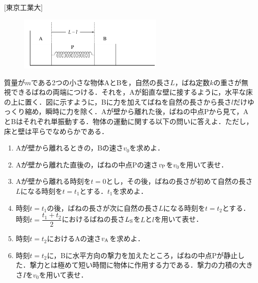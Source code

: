 

\noindent
{} [東京工業大]

\begin{figure}
  \centering
  \includegraphics[width=7cm]{fig/fig_1_10.pdf}
\end{figure}
質量が$m$である2つの小さな物体AとBを，自然の長さ$L$，ばね定数$k$の重さが無視できるばねの両端につける．それを，Aが鉛直な壁に接するように，水平な床の上に置く．図に示すように，Bに力を加えてばねを自然の長さから長さ$l$だけゆっくり縮め，瞬時に力を除く．Aが壁から離れた後，ばねの中点Pから見て，AとBはそれぞれ単振動する．物体の運動に関する以下の問いに答えよ．ただし，床と壁は平らでなめらかである．
\begin{enumerate}[(1)]
  \item {\hzw}Aが壁から離れるときの，Bの速さ$v_0$を求めよ．
  \item {\hzw}Aが壁から離れた直後の，ばねの中点Pの速さ$v_\mathrm{P}$を$v_0$を用いて表せ．
  \item {\hzw}Aが壁から離れる時刻を$t = 0$とし，その後，ばねの長さが初めて自然の長さ$L$になる時刻を$t = t_1$とする．$t_1$を求めよ．
  \item {\hzw}時刻$t = t_1$の後，ばねの長さが次に自然の長さ$L$になる時刻を$t = t_2$とする．時刻$t = \dfrac{t_1 + t_2}{2}$におけるばねの長さ$L_\mathrm{S}$を$L$と$l$を用いて表せ．
  \item {\hzw}時刻$t=t_2$におけるAの速さ$v_\mathrm{A}$を求めよ．
  \item {\hzw}時刻$t = t_2$に，Bに水平方向の撃力を加えたところ，ばねの中点Pが静止した．撃力とは極めて短い時間に物体に作用する力である．撃力の力積の大きさ$I$を$v_0$を用いて表せ．
\end{enumerate}


